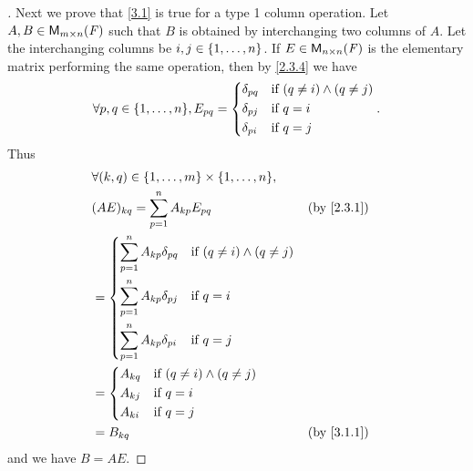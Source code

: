 \begin{proof}[]
  Next we prove that \cref{3.1} is true for a type 1 column operation.
  Let \(A, B \in \mathsf{M}_{{m} \times n}({\mathit{F}})\) such that \(B\) is obtained by interchanging two columns of \(A\).
  Let the interchanging columns be \(i, j \in \left\lbrace1, \dots, n\right\rbrace\).
  If \(E \in \mathsf{M}_{{n} \times n}({\mathit{F}})\) is the elementary matrix performing the same operation, then by \cref{2.3.4} we have
  \[
    \forall p, q \in \set{1, \dots, n}, E_{p q} = \begin{dcases}
      \delta_{p q} & \text{if } (q \neq i) \land (q \neq j) \\
      \delta_{p j} & \text{if } q = i                       \\
      \delta_{p i} & \text{if } q = j
    \end{dcases}.
  \]
  Thus
  \begin{align*}
     & \forall (k, q) \in \set{1, \dots, m} \times \set{1, \dots, n},                                                \\
     & (AE)_{k q} = \sum_{p = 1}^n A_{k p} E_{p q}                                     &  & \text{(by \cref{2.3.1})} \\
     & = \begin{dcases}
           \sum_{p = 1}^n A_{k p} \delta_{p q} & \text{if } (q \neq i) \land (q \neq j) \\
           \sum_{p = 1}^n A_{k p} \delta_{p j} & \text{if } q = i                       \\
           \sum_{p = 1}^n A_{k p} \delta_{p i} & \text{if } q = j
         \end{dcases}                                \\
     & = \begin{dcases}
           A_{k q} & \text{if } (q \neq i) \land (q \neq j) \\
           A_{k j} & \text{if } q = i                       \\
           A_{k i} & \text{if } q = j
         \end{dcases}                                                            \\
     & = B_{k q}                                                                       &  & \text{(by \cref{3.1.1})}
  \end{align*}
  and we have \(B = AE\).


\end{proof}
